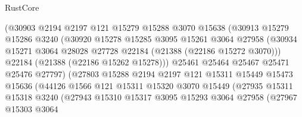 \begin{lexlean}{RustCore}
\begin{coremodule}
                            (@30903
                              @2194
                              @2197
                              @121
                              @15279
                              @15288
                              @3070
                              @15638
                              (@30913
                                @15279
                                @15286
                                @3240
                                (@30920
                                  @15278
                                  @15285
                                  @3095
                                  @15261
                                  @3064
                                  @27958
                                  (@30934
                                    @15271
                                    @3064
                                    @28028
                                    @27728
                                    @22184
                                    (@21388 (@22186 @15272 @3070)))
                                  @22184
                                  (@21388 (@22186 @15262 @15278)))
                                @25461
                                @25464
                                @25467
                                @25471
                                @25476
                                @27797)
                              (@27803
                                @15288
                                @2194
                                @2197
                                @121
                                @15311
                                @15449
                                @15473
                                @15636
                                (@44126
                                  @1566
                                  @121
                                  @15311
                                  @15320
                                  @3070
                                  @15449
                                  (@27935
                                    @15311
                                    @15318
                                    @3240
                                    (@27943
                                      @15310
                                      @15317
                                      @3095
                                      @15293
                                      @3064
                                      @27958
                                      (@27967
                                        @15303
                                        @3064

\end{coremodule}
\end{lexlean}
